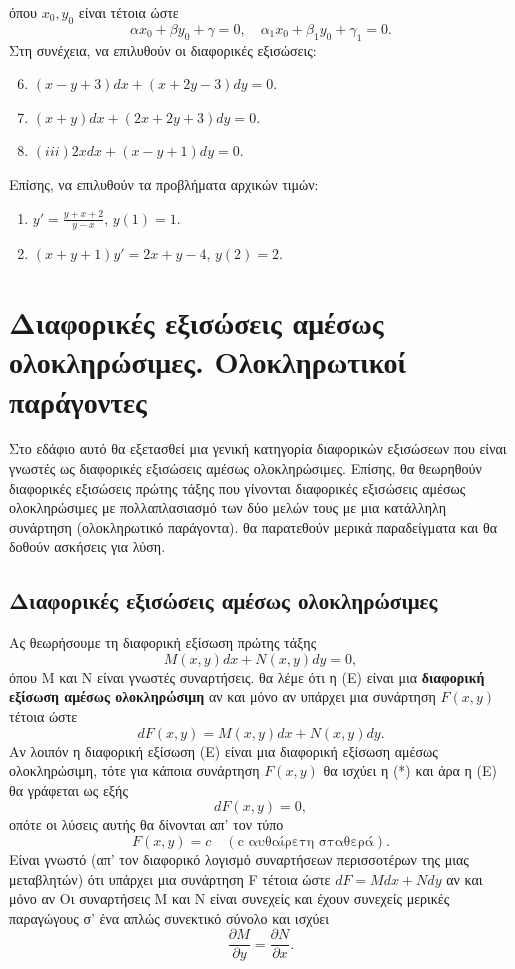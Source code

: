\documentclass[11pt,a4paper,twoside]{book}
\begin{document}
όπου $x_0, y_0$ είναι τέτοια ώστε
\[
\alpha x_0 + \beta y_0 + \gamma = 0, \quad \alpha_1 x_0 + \beta_1 y_0 + \gamma_1 = 0.
\]
Στη συνέχεια, να επιλυθούν οι διαφορικές εξισώσεις:
\begin{enumerate}[label=(\roman*)]
\setcounter{enumi}{5}
\item $(x-y+3)dx+(x+2y-3)dy=0$.
\item $(x+y)dx+(2x+2y+3)dy=0$.
\item $(iii) 2xdx+(x-y+1)dy=0$.
\end{enumerate}
Επίσης, να επιλυθούν τα προβλήματα αρχικών τιμών:
\begin{enumerate}[label=(\roman*)']
\item $y'=\frac{y+x+2}{y-x}$, $y(1)=1$.
\item $(x+y+1)y' = 2x+y-4$, $y(2)=2$.
\end{enumerate}

\section{Διαφορικές εξισώσεις αμέσως ολοκληρώσιμες. Ολοκληρωτικοί παράγοντες}

Στο εδάφιο αυτό θα εξετασθεί μια γενική κατηγορία διαφορικών εξισώσεων που είναι γνωστές ως διαφορικές εξισώσεις αμέσως ολοκληρώσιμες. Επίσης, θα θεωρηθούν διαφορικές εξισώσεις πρώτης τάξης που γίνονται διαφορικές εξισώσεις αμέσως ολοκληρώσιμες με πολλαπλασιασμό των δύο μελών τους με μια κατάλληλη συνάρτηση (ολοκληρωτικό παράγοντα). θα παρατεθούν μερικά παραδείγματα και θα δοθούν ασκήσεις για λύση.

\subsection{Διαφορικές εξισώσεις αμέσως ολοκληρώσιμες}

Ας θεωρήσουμε τη διαφορική εξίσωση πρώτης τάξης
\begin{equation}\label{eq:exact}
M(x,y)dx+N(x,y)dy=0, \tag{E}
\end{equation}
όπου M και N είναι γνωστές συναρτήσεις. θα λέμε ότι η (Ε) είναι μια \textbf{διαφορική εξίσωση αμέσως ολοκληρώσιμη} αν και μόνο αν υπάρχει μια συνάρτηση $F(x,y)$ τέτοια ώστε
\begin{equation}\label{eq:exact_cond}
dF(x,y) = M(x,y)dx+N(x,y)dy. \tag{*}
\end{equation}
Αν λοιπόν η διαφορική εξίσωση (Ε) είναι μια διαφορική εξίσωση αμέσως ολοκληρώσιμη, τότε για κάποια συνάρτηση $F(x,y)$ θα ισχύει η (*) και άρα η (Ε) θα γράφεται ως εξής
\[
dF(x,y) = 0,
\]
οπότε οι λύσεις αυτής θα δίνονται απ' τον τύπο
\[
F(x,y) = c \quad (\text{c αυθαίρετη σταθερά}).
\]
Είναι γνωστό (απ' τον διαφορικό λογισμό συναρτήσεων περισσοτέρων της μιας μεταβλητών) ότι υπάρχει μια συνάρτηση F τέτοια ώστε $dF = Mdx+Ndy$ αν και μόνο αν
Οι συναρτήσεις M και N είναι συνεχείς και έχουν συνεχείς μερικές παραγώγους σ' ένα απλώς συνεκτικό σύνολο και ισχύει
\[
\frac{\partial M}{\partial y} = \frac{\partial N}{\partial x}.
\]
\end{document}
